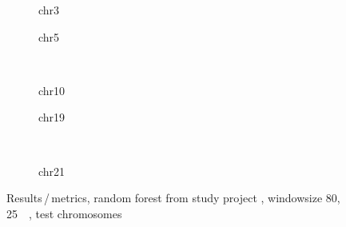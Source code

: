 \begin{figure}[p] %
    \begin{subfigure}{0.45\textwidth}
        \scriptsize
        \caption{chr3}
    \end{subfigure} \hfill
    \begin{subfigure}{0.45\textwidth}
        \scriptsize
        \caption{chr5}
    \end{subfigure}\\[5mm]
    \begin{subfigure}{0.45\textwidth}
        \scriptsize
        \caption{chr10}
    \end{subfigure}\hfill
    \begin{subfigure}{0.45\textwidth}
        \scriptsize
        \caption{chr19}
    \end{subfigure}\\[3mm]
    \centering
    \begin{subfigure}{0.45\textwidth}
        \scriptsize
        \caption{chr21}
    \end{subfigure} \hfill
    \caption{Results\,/\,metrics, random forest from study project \cite{Krauth2020}, windowsize 80, \SI{25}{\kilo\bp}, test chromosomes}  \label{fig:results:randomforest_masterproject_pearson}
\end{figure}
